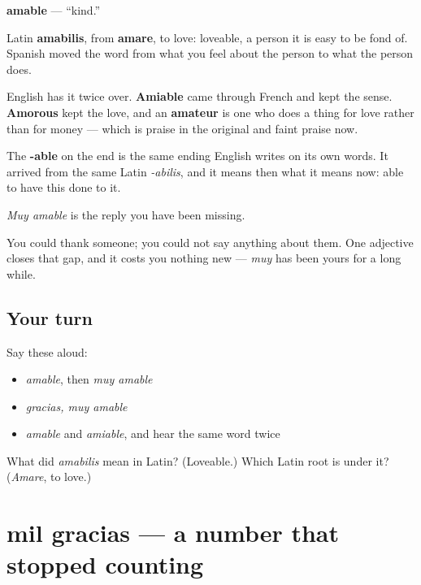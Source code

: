\begin{cousinweb}
\textbf{amable} — \textquotedblleft{}kind.\textquotedblright{}

Latin \textbf{amabilis}, from \textbf{amare}, to love: loveable, a person it is easy to be fond of. Spanish moved the word from what you feel about the person to what the person does.

English has it twice over. \textbf{Amiable} came through French and kept the sense. \textbf{Amorous} kept the love, and an \textbf{amateur} is one who does a thing for love rather than for money — which is praise in the original and faint praise now.

The \textbf{-able} on the end is the same ending English writes on its own words. It arrived from the same Latin \emph{-abilis}, and it means then what it means now: able to have this done to it.
\end{cousinweb}

\begin{grammarlens}[title={What you've built}]
\emph{Muy amable} is the reply you have been missing.

You could thank someone; you could not say anything about them. One adjective closes that gap, and it costs you nothing new — \emph{muy} has been yours for a long while.
\end{grammarlens}

\subsection*{Your turn}
Say these aloud:

\begin{itemize}
\raggedright
  \item \emph{amable}, then \emph{muy amable}
  \item \emph{gracias, muy amable}
  \item \emph{amable} and \emph{amiable}, and hear the same word twice
\end{itemize}

\begin{tcolorbox}[breakable,colback=teal!4,colframe=teal!35!black,title={Before you move on}]
What did \emph{amabilis} mean in Latin? (Loveable.) Which Latin root is under it? (\emph{Amare}, to love.)
\end{tcolorbox}
\section[mil gracias]{mil gracias — a number that stopped counting}

